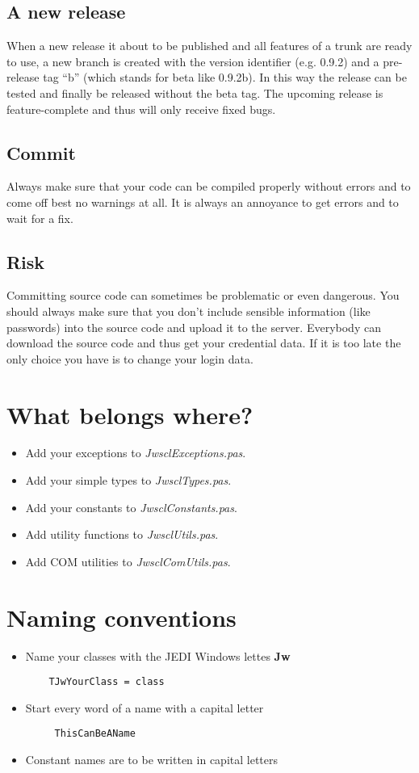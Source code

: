 \documentclass[a4paper,oneside,10pt]{article}
\begin{document}
\subsection{A new release}
When a new release it about to be published and all features of a trunk are ready to use, a new branch is created with the version identifier (e.g. 0.9.2) and a pre-release tag "`b"' (which stands for beta like 0.9.2b). In this way the release can be tested and finally be released without the beta tag. The upcoming release is feature-complete and thus will only receive fixed bugs.

\subsection{Commit}
Always make sure that your code can be compiled properly without errors and to come off best no warnings at all. It is always an annoyance to get errors and to wait for a fix.

\subsection{Risk}
Committing source code can sometimes be problematic or even dangerous. You should always make sure that you don't include sensible information (like passwords) into the source code and upload it to the server. Everybody can download the source code and thus get your credential data. If it is too late the only choice you have is to change your login data.

\section{What belongs where?}\label{Whatbelongswhere}
\begin{itemize}
	\item Add your exceptions to \textit{JwsclExceptions.pas}.
  \item Add your simple types to \textit{JwsclTypes.pas}.
  \item Add your constants to \textit{JwsclConstants.pas}.
  \item Add utility functions to \textit{JwsclUtils.pas}.
  \item Add COM utilities to \textit{JwsclComUtils.pas}.
\end{itemize}

\section{Naming conventions}
\begin{itemize}
	\item Name your classes with the JEDI Windows lettes \textbf{Jw} 
	\begin{lstlisting}
	TJwYourClass = class
	\end{lstlisting} 
	\item Start every word of a name with a capital letter 
	\begin{lstlisting}
	 ThisCanBeAName
	\end{lstlisting}
	\item Constant names are to be written in capital letters
\end{itemize}
\end{document}
